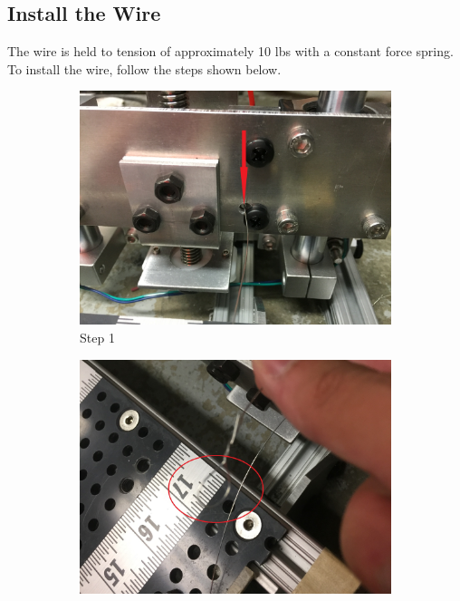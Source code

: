 \documentclass[titlepage,12pt,letter]{report}
\numberwithin{equation}{chapter}
\begin{document}
\newpage
\subsection{Install the Wire}
The wire is held to tension of approximately 10 lbs with a constant force spring. To install the wire, follow the steps shown below.

\begin{enumerate}[itemsep = 5pt,topsep=0pt]
\begin{figure}[H]
	\centering
	\begin{subfigure}[b]{.475\textwidth}
		\centering
		\includegraphics[width=\textwidth]{./Figures/Wire_mounting/1.jpg}
		\caption{Step 1}
	\end{subfigure}
	\begin{subfigure}[b]{.475\textwidth}
		\centering
		\includegraphics[width=\textwidth]{./Figures/Wire_mounting/2.jpg}

\end{subfigure}
\end{figure}
\end{enumerate}
\end{document}
